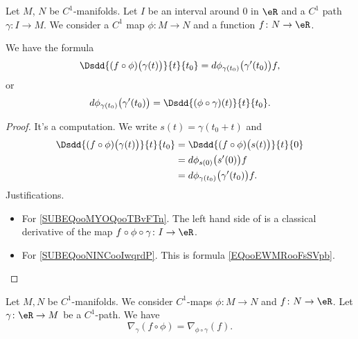 \begin{proposition}      \label{PROPooALATooGgcVQV}
	Let \( M\), \( N\) be \( C^1\)-manifolds. Let \(I \) be an interval around \( 0\) in \( \eR\) and a \( C^1\) path \( \gamma\colon I\to M\). We consider a \( C^1\) map \( \phi\colon M\to N\) and a function \( f\colon N\to \eR\).

	We have the formula
	\begin{equation}        \label{EQooYHBZooUqInIC}
		\Dsdd{ (f\circ\phi)\big( \gamma(t) \big) }{t}{t_0}=d\phi_{\gamma(t_0)}\big( \gamma'(t_0) \big)f,
	\end{equation}
	or
	\begin{equation}        \label{EQooVLUIooAbGZEi}
		d\phi_{\gamma(t_0)}\big( \gamma'(t_0) \big)=\Dsdd{ (\phi\circ \gamma)(t) }{t}{t_0}.
	\end{equation}
\end{proposition}

\begin{proof}
	It's a computation. We write \( s(t)=\gamma(t_0+t)\) and
	\begin{subequations}
		\begin{align}
			\Dsdd{ (f\circ\phi)\big( \gamma(t) \big) }{t}{t_0} & =\Dsdd{ (f\circ\phi)\big( s(t) \big) }{t}{0}        \label{SUBEQooMYOQooTBvFTn} \\
			                                                   & =d\phi_{s(0)}\big( s'(0) \big)f        \label{SUBEQooNINCooIwqrdP}              \\
			                                                   & =d\phi_{\gamma(t_0)}\big( \gamma'(t_0) \big)f.
		\end{align}
	\end{subequations}
	Justifications.
	\begin{itemize}
		\item For \eqref{SUBEQooMYOQooTBvFTn}.  The left hand side of is a classical derivative of the map \( f\circ\phi\circ \gamma\colon I\to \eR\).
		\item For \eqref{SUBEQooNINCooIwqrdP}.  This is formula \eqref{EQooEWMRooFsSVpb}.
	\end{itemize}
\end{proof}

\begin{lemma}        \label{LEMooBOZBooNJMccB}
	Let \( M,N\) be \( C^1\)-manifolds. We consider \( C^1\)-maps \( \phi\colon M\to N\) and \( f \colon N\to \eR\). Let \( \gamma\colon \eR\to M\) be a \( C^1\)-path. We have
	\begin{equation}
		\nabla_{\gamma}(f\circ\phi)=\nabla_{\phi\circ \gamma}(f).
	\end{equation}
\end{lemma}

